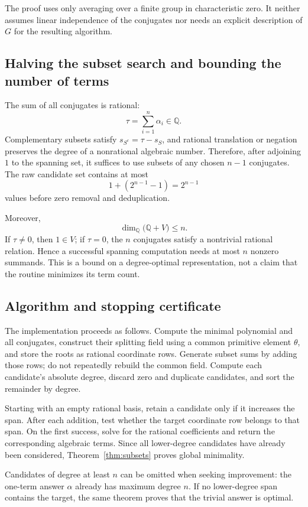 \documentclass[11pt,letterpaper]{article}
\theoremstyle{definition}\newtheorem{definition}[theorem]{Definition}
\theoremstyle{remark}\newtheorem{remark}[theorem]{Remark}
\newcommand{\Q}{\mathbb Q}
\begin{document}
The proof uses only averaging over a finite group in characteristic zero. It neither assumes linear independence of the conjugates nor needs an explicit description of $G$ for the resulting algorithm.

\subsection{Halving the subset search and bounding the number of terms}
The sum of all conjugates is rational:
\[
 \tau=\sum_{i=1}^n\alpha_i\in\Q.
\]
Complementary subsets satisfy $s_{S^c}=\tau-s_S$, and rational translation or negation preserves the degree of a nonrational algebraic number. Therefore, after adjoining $1$ to the spanning set, it suffices to use subsets of any chosen $n-1$ conjugates. The raw candidate set contains at most
\[
 1+(2^{n-1}-1)=2^{n-1}
\]
values before zero removal and deduplication.

Moreover,
\begin{equation}
 \dim_\Q\bigl(\Q+V\bigr)\le n.
 \label{eq:nterms}
\end{equation}
If $\tau\ne0$, then $1\in V$; if $\tau=0$, the $n$ conjugates satisfy a nontrivial rational relation. Hence a successful spanning computation needs at most $n$ nonzero summands. This is a bound on a degree-optimal representation, not a claim that the routine minimizes its term count.

\subsection{Algorithm and stopping certificate}
The implementation proceeds as follows. Compute the minimal polynomial and all conjugates, construct their splitting field using a common primitive element $\theta$, and store the roots as rational coordinate rows. Generate subset sums by adding those rows; do not repeatedly rebuild the common field. Compute each candidate's absolute degree, discard zero and duplicate candidates, and sort the remainder by degree.

Starting with an empty rational basis, retain a candidate only if it increases the span. After each addition, test whether the target coordinate row belongs to that span. On the first success, solve for the rational coefficients and return the corresponding algebraic terms. Since all lower-degree candidates have already been considered, Theorem~\ref{thm:subsets} proves global minimality.

Candidates of degree at least $n$ can be omitted when seeking improvement: the one-term answer $\alpha$ already has maximum degree $n$. If no lower-degree span contains the target, the same theorem proves that the trivial answer is optimal.
\end{document}
